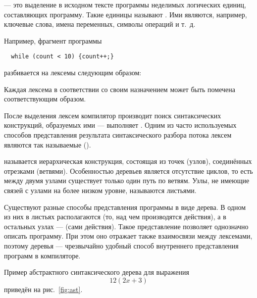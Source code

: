  — это выделение в
исходном тексте программы неделимых логических единиц, составляющих
программу. Такие единицы называют . Ими
являются, например, ключевые слова, имена переменных, символы операций
и т.~д.

Например, фрагмент программы
\begin{lstlisting}
  while (count < 10) {count++;}
\end{lstlisting}
разбивается на лексемы следующим образом:


Каждая лексема в соответствии со своим назначением может быть
помечена соответствующим образом.

После выделения лексем компилятор производит поиск синтаксических
конструкций, образуемых ими — выполняет
. Одним из часто
используемых способов представления результата синтаксического разбора
потока лексем являются так называемые 
().

 называется иерархическая конструкция, состоящая
из точек (узлов), соединённых отрезками (ветвями). Особенностью
деревьев является отсутствие циклов, то есть между двумя узлами
существует только один путь по ветвям. Узлы, не имеющие связей с
узлами на более низком уровне, называются листьями.

Существуют разные способы представления программы в виде дерева. В
одном из них в листьях располагаются  (то, над
чем производятся действия), а в остальных узлах —
 (сами действия). Такое представление
позволяет однозначно описать программу. При этом оно отражает также
взаимосвязи между лексемами, поэтому деревья — чрезвычайно удобный
способ внутреннего представления программ в компиляторе.

Пример абстрактного синтаксического дерева для выражения
\[
12(2x+3)
\]
приведён на рис.~\ref{fig:ast}.

